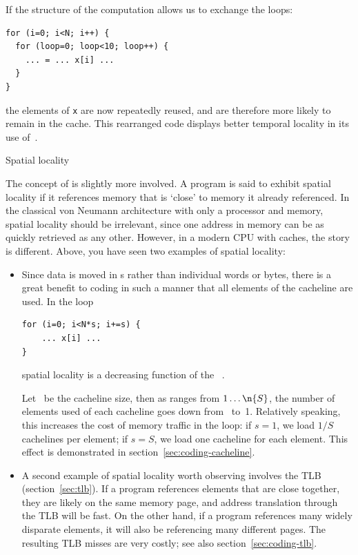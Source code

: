 If the structure of the computation allows us to exchange
the loops:
\begin{verbatim}
for (i=0; i<N; i++) {
  for (loop=0; loop<10; loop++) {
    ... = ... x[i] ...
  }
}
\end{verbatim}
the elements of \texttt{x} are now repeatedly reused, and are
therefore more likely to remain in the cache. This rearranged code
displays better
temporal locality in its use of~.

 {Spatial locality}

The concept of  is slightly more
involved. A program is said to exhibit spatial locality if it
references memory that is `close' to memory it already referenced. In
the classical von Neumann architecture with only a processor and
memory, spatial locality should be irrelevant, since one address in
memory can be as quickly  retrieved as any other. However, in a modern CPU
with caches, the story is different. Above, you have seen two examples
of spatial locality:
\begin{itemize}
\item Since data is moved in s rather than
  individual words or bytes,
  there is a great benefit to coding in such a manner that all
  elements of the cacheline are used. In the loop
\begin{verbatim}
for (i=0; i<N*s; i+=s) {
    ... x[i] ...
}
\end{verbatim}
  spatial locality is a decreasing function of the
  ~.

  Let ~be the cacheline size, then as  ranges from $1\ldots\n{S}$,
  the number of elements used of each cacheline goes
  down from~ to~1. Relatively speaking, this increases the cost
  of memory traffic in the loop: if $s=1$, we load $1/S$ cachelines
  per element; if $s=S$, we load one cacheline for each element. This
  effect is demonstrated in section~\ref{sec:coding-cacheline}.
\item A second example of spatial locality worth observing involves
  the \ac{TLB} (section~\ref{sec:tlb}). If a program references
  elements that are close together, they are likely on the same memory
  page, and address translation through the TLB will be fast. On the
  other hand, if a program references many widely disparate elements,
  it will also be referencing many different pages. The resulting TLB
  misses are very costly; see also section~\ref{sec:coding-tlb}.
\end{itemize}

